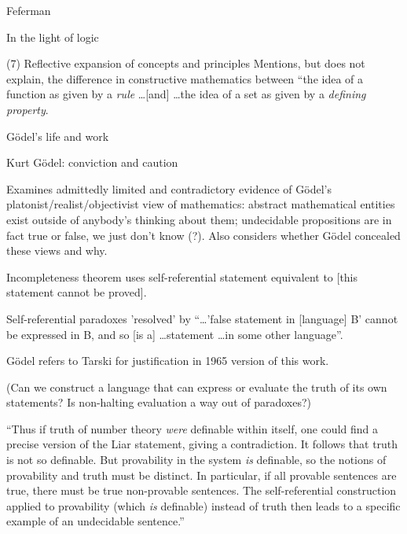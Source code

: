 \begin{plSection}{Feferman}
\begin{plSection}{In the light of logic}
\begin{plSection}{(7) Reflective expansion of concepts and principles}
Mentions, but does not explain, the difference 
in constructive mathematics between
``the idea of a function as given by a \textit{rule}
\ldots [and] \ldots the idea of a set as given by a 
\textit{defining property}. 

\end{plSection}%
\begin{plSection}{G\"{o}del's life and work}
\label{sec:Godels_life_and_work}


\end{plSection}%
\begin{plSection}{Kurt G\"{o}del: conviction and caution}
\label{sec:Kurt_Godel_conviction_and_caution}

Examines admittedly limited and contradictory evidence
of G\"{o}del's platonist/realist/objectivist view of
mathematics: abstract mathematical entities exist outside 
of anybody's thinking about them;
undecidable propositions are in fact true or false, we just don't
know (?).
Also considers whether G\"{o}del concealed these views and 
why. 

Incompleteness theorem uses self-referential statement
equivalent to [this statement cannot be 
proved].~\cite[p~156]{Feferman:1998:LightOfLogic}

Self-referential paradoxes 'resolved' by 
``\ldots 'false statement in [language] B' cannot be expressed in
B, and so [is a] \ldots statement \ldots in some other 
language''.~\cite[p~157]{Feferman:1998:LightOfLogic}

G\"{o}del refers to 
Tarski  
for justification in 1965 version 
of this work. 
 
(Can we construct a language that can express 
or evaluate the truth of 
its own statements? 
Is non-halting evaluation a way out of paradoxes?)

``Thus if truth of number theory \textit{were}
definable within itself, one could find a precise version of the
Liar statement, giving a contradiction.
It follows that truth is not so definable.
But provability in the system \textit{is} definable,
so the notions of provability and truth must be distinct.
In particular, if all provable sentences are true,
there must be true non-provable sentences.
The self-referential construction applied to provability
(which \textit{is} definable) instead of truth then 
leads to a specific example of an undecidable 
sentence.''~\cite[p~159]{Feferman:1998:LightOfLogic}


\end{plSection}
\end{plSection}
\end{plSection}
